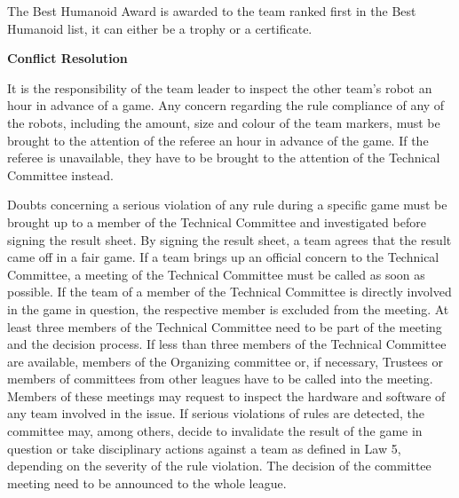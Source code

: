 \bigskip

The Best Humanoid Award is awarded to the team ranked first in the Best Humanoid list,
it can either be a trophy or a certificate.

\bigskip

{\bfseries Conflict Resolution}

\headlinebox

It is the responsibility of the team leader to inspect the other team's robot an hour in advance of a game. Any concern regarding the rule compliance of any of the robots, including the amount, size and colour of the team markers, must be brought to the attention of the referee an hour in advance of the game. If the referee is unavailable, they have to be brought to the attention of the Technical Committee instead.

\bigskip

Doubts concerning a serious violation of any rule during a specific game must be brought up to a member of the Technical Committee and investigated before signing the result sheet. By signing the result sheet, a team agrees that the result came off in a fair game. If a team brings up an official concern to the Technical Committee, a meeting of the Technical Committee must be called as soon as possible. If the team of a member of the Technical Committee is directly involved in the game in question, the respective member is excluded from the meeting. At least three members of the Technical Committee need to be part of the meeting and the decision process. If less than three members of the Technical Committee are available, members of the Organizing committee or, if necessary, Trustees or members of committees from other leagues have to be called into the meeting. Members of these meetings may request to inspect the hardware and software of any team involved in the issue. If serious violations of rules are detected, the committee may, among others, decide to invalidate the result of the game in question or take disciplinary actions against a team as defined in Law 5, depending on the severity of the rule violation. The decision of the committee meeting need to be announced to the whole league.

\bigskip
{}

